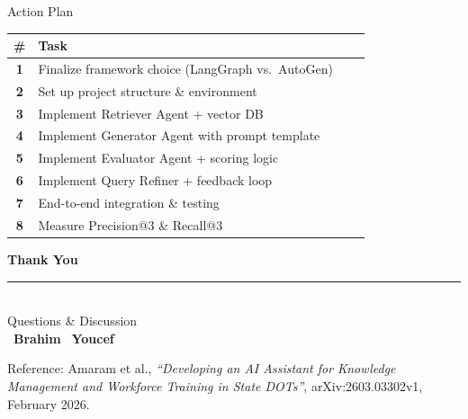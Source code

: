 \documentclass[aspectratio=169]{beamer}
\begin{document}
\begin{frame}{Action Plan}
  \begin{center}
  \renewcommand{\arraystretch}{1.4}
  \small
  \begin{tabular}{>{\bfseries}c l >{\bfseries}l l}
    \toprule
    \textbf{\#} & \textbf{Task} & & \\
    \midrule
    1 & Finalize framework choice (LangGraph vs.\ AutoGen) & & \\
    2 & Set up project structure \& environment             & & \\
    3 & Implement Retriever Agent + vector DB               & & \\
    4 & Implement Generator Agent with prompt template      & & \\
    5 & Implement Evaluator Agent + scoring logic           & & \\
    6 & Implement Query Refiner + feedback loop             & & \\
    7 & End-to-end integration \& testing                  & & \\
    8 & Measure Precision@3 \& Recall@3                    & & \\
    \bottomrule
  \end{tabular}
  \end{center}
\end{frame}

{
\begin{frame}[plain]
  \vfill
  \begin{center}
    {\Huge\textbf{\textcolor{primary}{Thank You}}}\\[0.5cm]
    \rule{6cm}{0.4pt}\\[0.4cm]
    {\large Questions \& Discussion}\\[0.8cm]
    \faUser\ \textbf{Brahim} \qquad \faUser\ \textbf{Youcef}
  \end{center}
  \vfill
  \begin{block}{}
    \centering\footnotesize
    Reference: Amaram et al., \textit{``Developing an AI Assistant for Knowledge Management and Workforce Training in State DOTs''}, arXiv:2603.03302v1, February 2026.
  \end{block}
\end{frame}
}
\end{document}
